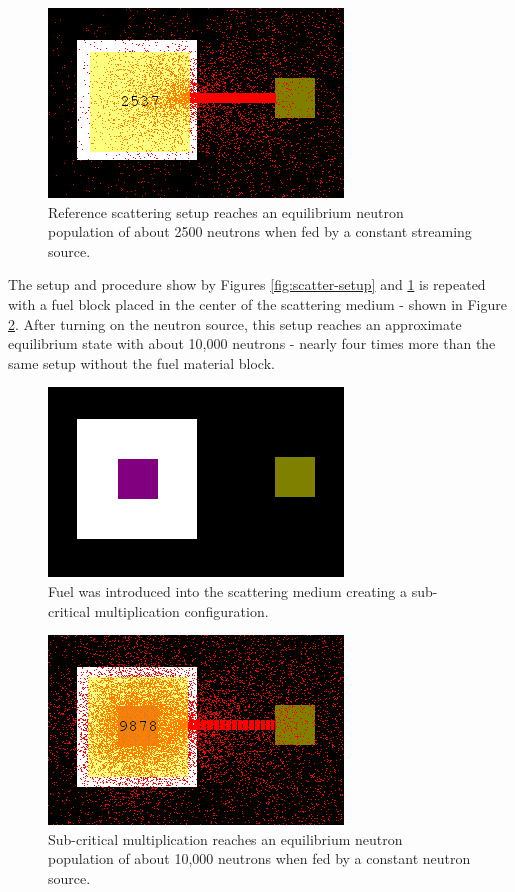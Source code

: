 \documentclass{anstrans}
\begin{document}
\begin{figure}
    \centering
    \includegraphics{scatter-equil.png}
    \caption{Reference scattering setup reaches an equilibrium neutron population of about 2500 neutrons when fed by a constant streaming source.}
    \label{fig:scatter-equil}
\end{figure}

The setup and procedure show by Figures \ref{fig:scatter-setup} and
\ref{fig:scatter-equil} is repeated with a fuel block placed in the center of
the scattering medium - shown in Figure \ref{fig:subcrit-setup}.  After
turning on the neutron source, this setup reaches an approximate equilibrium
state with about 10,000 neutrons - nearly four times more than the same setup
without the fuel material block.

\begin{figure}
    \centering
    \includegraphics{subcrit-mult-setup.png}
    \caption{Fuel was introduced into the scattering medium creating a sub-critical multiplication configuration.}
    \label{fig:subcrit-setup}
\end{figure}

\begin{figure}
    \centering
    \includegraphics{subcrit-mult-equil.png}
    \caption{Sub-critical multiplication reaches an equilibrium neutron population of about 10,000 neutrons when fed by a constant neutron source.}
    \label{fig:subcrit-equil}
\end{figure}
\end{document}
